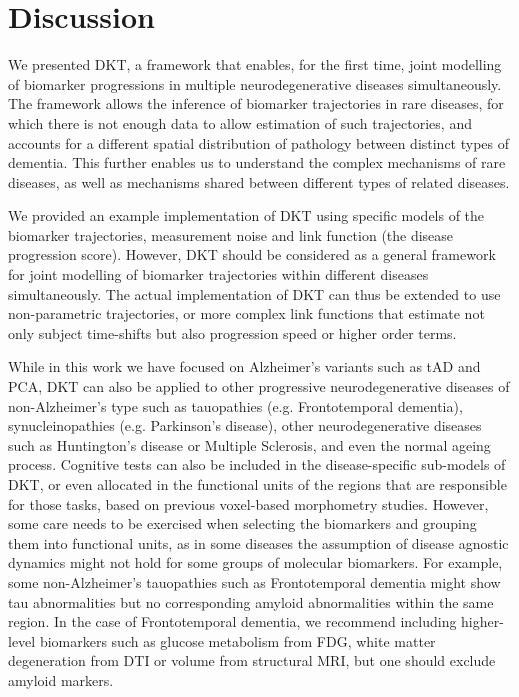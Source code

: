 


\section{Discussion}
\label{sec:dktDis}


We presented DKT, a framework that enables, for the first time, joint modelling of biomarker progressions in multiple neurodegenerative diseases simultaneously. The framework allows the inference of biomarker trajectories in rare diseases, for which there is not enough data to allow estimation of such trajectories, and accounts for a different spatial distribution of pathology between distinct types of dementia. This further enables us to understand the complex mechanisms of rare diseases, as well as mechanisms shared between different types of related diseases.

We provided an example implementation of DKT using specific models of the biomarker trajectories, measurement noise and link function (the disease progression score). However, DKT should be considered as a general framework for joint modelling of biomarker trajectories within different diseases simultaneously. The actual implementation of DKT can thus be extended to use non-parametric trajectories, or more complex link functions that estimate not only subject time-shifts but also progression speed or higher order terms.

While in this work we have focused on Alzheimer's variants such as tAD and PCA, DKT can also be applied to other progressive neurodegenerative diseases of non-Alzheimer's type such as tauopathies (e.g. Frontotemporal dementia), synucleinopathies (e.g. Parkinson's disease), other neurodegenerative diseases such as Huntington's disease or Multiple Sclerosis, and even the normal ageing process. Cognitive tests can also be included in the disease-specific sub-models of DKT, or even allocated in the functional units of the regions that are responsible for those tasks, based on previous voxel-based morphometry studies. However, some care needs to be exercised when selecting the biomarkers and grouping them into functional units, as in some diseases the assumption of disease agnostic dynamics might not hold for some groups of molecular biomarkers. For example, some non-Alzheimer's tauopathies such as Frontotemporal dementia might show tau abnormalities but no corresponding amyloid abnormalities within the same region. In the case of Frontotemporal dementia, we recommend including higher-level biomarkers such as glucose metabolism from FDG, white matter degeneration from DTI or volume from structural MRI, but one should exclude amyloid markers. 


